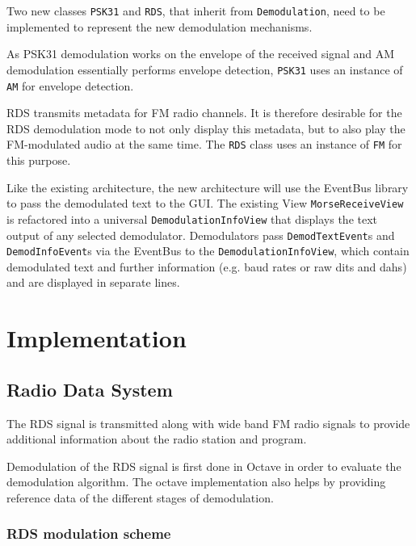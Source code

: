 Two new classes \texttt{PSK31} and \texttt{RDS}, that inherit from
\texttt{Demodulation}, need to be implemented to represent the new demodulation 
mechanisms.

As \ac{PSK31} demodulation works on the envelope of the received signal
and \ac{AM} demodulation essentially performs envelope detection, \texttt{PSK31}
uses an instance of \texttt{AM} for envelope detection.

\ac{RDS} transmits metadata for \ac{FM} radio channels. It is therefore desirable for the 
\ac{RDS} demodulation mode to not only display this metadata, but to also play the 
\ac{FM}-modulated audio at the same time. The \texttt{RDS} class uses an
instance of \texttt{FM} for this purpose.

Like the existing architecture, the new architecture will use the EventBus
library to pass the demodulated text to the \ac{GUI}. The existing View
\texttt{MorseReceiveView} is refactored into a universal
\texttt{De\-mo\-du\-la\-tion\-In\-fo\-View} that displays the text output of any selected 
demodulator. Demodulators pass \texttt{DemodTextEvent}s and 
\texttt{DemodInfoEvent}s via the EventBus to the \texttt{De\-mo\-du\-la\-tion\-In\-fo\-View}, 
which contain demodulated text and further information (e.g. baud rates or raw 
dits and dahs) and are displayed in separate lines.

\chapter{Implementation}\label{ch:implementation} %

\section{Radio Data System}

The \ac{RDS} signal is transmitted along with wide band \ac{FM}
radio signals to provide additional information about the
radio station and program.

Demodulation of the \ac{RDS} signal is first done in Octave in order to
evaluate the demodulation algorithm. The octave implementation
also helps by providing reference data of the different stages
of demodulation. 

\subsection{RDS modulation scheme}

